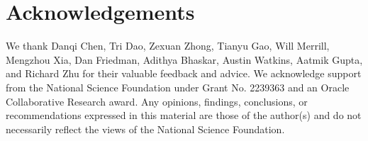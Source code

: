 \section{Acknowledgements}
We thank Danqi Chen, Tri Dao, Zexuan Zhong, Tianyu Gao, Will Merrill, Mengzhou Xia, Dan Friedman, Adithya Bhaskar, Austin Watkins, Aatmik Gupta, and Richard Zhu for their valuable feedback and advice.
We acknowledge support from the National Science Foundation under Grant No. 2239363 and an Oracle Collaborative Research award.
Any opinions, findings, conclusions, or recommendations expressed in this material are those of the author(s) and do not necessarily reflect the views of the National Science Foundation.